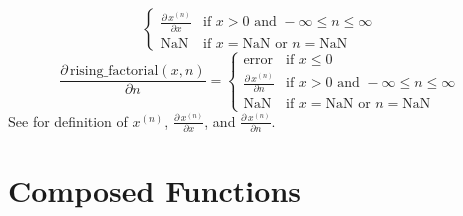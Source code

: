 \begin{description}
{\[\begin{cases}
  \frac{\partial\, x^{(n)}}{\partial x} & \mbox{if } x > 0 \textrm{ and } -\infty \leq n \leq \infty \\[6pt]
  \textrm{NaN} & \mbox{if } x = \textrm{NaN or } n = \textrm{NaN}
\end{cases}
\]
%
\[
\frac{\partial\,\mbox{rising\_factorial}(x,n)}{\partial n} = 
\begin{cases}
  \textrm{error} & \mbox{if } x \leq 0\\
  \frac{\partial\, x^{(n)}}{\partial n} & \mbox{if } x > 0 \textrm{ and } -\infty \leq n \leq \infty \\[6pt]
  \textrm{NaN} & \mbox{if } x = \textrm{NaN or } n = \textrm{NaN}
\end{cases}
\]
%
See  for definition of 
$x^{(n)}$, $\frac{\partial\,x^{(n)}}{\partial x}$, and $\frac{\partial\,x^{(n)}}{\partial n}$.
}
%
\end{description}


\section{Composed Functions}\label{composed-functions.section}

